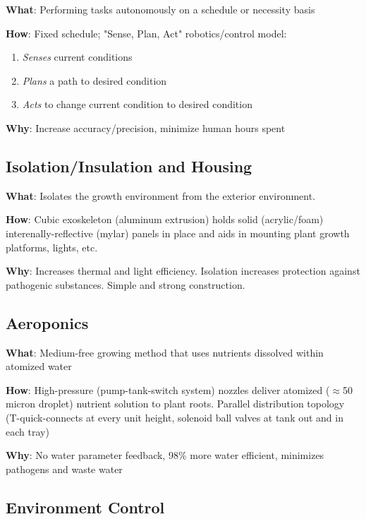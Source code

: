 \documentclass{report}
\begin{document}
\textbf{What}: Performing tasks autonomously on a schedule or necessity basis

\textbf{How}: Fixed schedule; "Sense, Plan, Act" robotics/control model:
\begin{enumerate}
    \item \textit{Senses} current conditions
    \item \textit{Plans} a path to desired condition
    \item \textit{Acts} to change current condition to desired condition
\end{enumerate}
\textbf{Why}: Increase accuracy/precision, minimize human hours spent

\subsection{Isolation/Insulation and Housing}
\label{sec:isolationinsulation}

\textbf{What}: Isolates the growth environment from the exterior environment. 

\textbf{How}: Cubic exoskeleton (aluminum extrusion) holds solid (acrylic/foam) interenally-reflective (mylar) panels in place and aids in mounting plant growth platforms, lights, etc.

\textbf{Why}: Increases thermal and light efficiency. Isolation increases protection against pathogenic substances. Simple and strong construction.

\subsection{Aeroponics}
\label{sec:aeroponics}

\textbf{What}: Medium-free growing method that uses nutrients dissolved within atomized water

\textbf{How}: High-pressure (pump-tank-switch system) nozzles deliver atomized ($\approx$50 micron droplet) nutrient solution to plant roots. Parallel distribution topology (T-quick-connects at every unit height, solenoid ball valves at tank out and in each tray)

\textbf{Why}: No water parameter feedback, 98\% more water efficient, minimizes pathogens and waste water

\newpage

\subsection{Environment Control}
\label{sec:environment}
\end{document}
